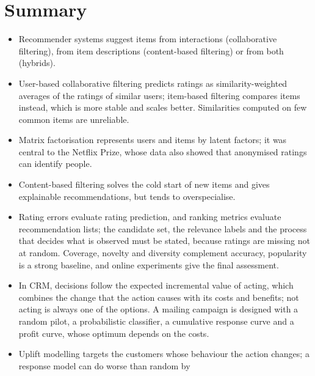 \section{Summary}\label{sec:summary7}

\begin{itemize}
  \item Recommender systems suggest items from interactions (collaborative filtering), from item descriptions (content-based
        filtering) or from both (hybrids).
  \item User-based collaborative filtering predicts ratings as similarity-weighted averages of the ratings of similar users;
        item-based filtering compares items instead, which is more stable and scales better. Similarities computed on few common
        items are unreliable.
  \item Matrix factorisation represents users and items by latent factors; it was central to the Netflix Prize, whose data also
        showed that anonymised ratings can identify people.
  \item Content-based filtering solves the cold start of new items and gives explainable recommendations, but tends to
        overspecialise.
  \item Rating errors evaluate rating prediction, and ranking metrics evaluate recommendation lists; the candidate set, the
        relevance labels and the process that decides what is observed must be stated, because ratings are missing not
        at random. Coverage, novelty and diversity complement accuracy, popularity is a strong baseline, and online
        experiments give the final assessment.
  \item In CRM, decisions follow the expected incremental value of acting, which combines the change that the action causes
        with its costs and benefits; not acting is always one of the options. A mailing campaign is designed with a random pilot, a probabilistic classifier, a cumulative response curve and a
        profit curve, whose optimum depends on the costs.
  \item Uplift modelling targets the customers whose behaviour the action changes; a response model can do worse than random by

\end{itemize}

